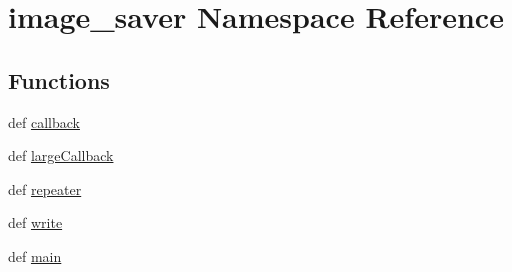 \hypertarget{namespaceimage__saver}{\section{image\-\_\-saver Namespace Reference}
\label{namespaceimage__saver}
}
\subsection*{Functions}
\begin{DoxyCompactItemize}
\item 
def \hyperlink{namespaceimage__saver_a07c9629aff789a28f3757757dfabf3e1}{callback}
\item 
def \hyperlink{namespaceimage__saver_ad06d91b6b4ada8ab8edaaa4ec1a4adb4}{large\-Callback}
\item 
def \hyperlink{namespaceimage__saver_a3c616c6a7a98682911e00dc2d6c13268}{repeater}
\item 
def \hyperlink{namespaceimage__saver_a1526543a0329d9a194d17fda75d0f5bb}{write}
\item 
def \hyperlink{namespaceimage__saver_a84366395f38b94e3ff1f0cb6233ffd9e}{main}
\end{DoxyCompactItemize}
